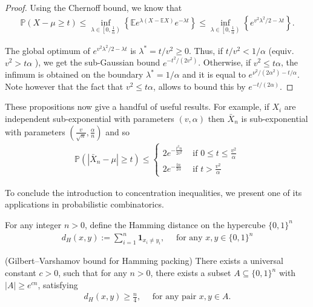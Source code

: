 \begin{proof}
    Using the Chernoff bound, we know that
\begin{align*}
\mathbb{P}(X-\mu \geq t) \leq \inf _{\lambda \in\left[0, \frac{1}{\alpha}\right)}\left\{\mathbb{E} e^{\lambda(X-\mathbb{E} X)} e^{-\lambda t}\right\} \leq \inf _{\lambda \in\left[0, \frac{1}{\alpha}\right)}\left\{e^{v^2 \lambda^2 / 2-\lambda t}\right\} .
\end{align*}


The global optimum of $e^{v^2 \lambda^2 / 2-\lambda t}$ is $\lambda^*=t / v^2 \geq 0$. Thus, if $t / v^2< 1 / \alpha$ (equiv. $v^2>t \alpha$ ), we get the sub-Gaussian bound $e^{-t^2 /\left(2 v^2\right)}$.
Otherwise, if $v^2 \leq t \alpha$, the infimum is obtained on the boundary $\lambda^*=1 / \alpha$ and it is equal to $e^{\nu^2 /\left(2 \alpha^2\right)-t / \alpha}$. Note however that the fact that $v^2 \leq t \alpha$, allows to bound this by $e^{-t /(2 \alpha)}$.
\end{proof}

 
\begin{remark}
    These propositions now give a handful of useful results. For example, if $X_i$ are independent sub-exponential with parameters $(v, \alpha)$ then $\bar{X}_n$ is sub-exponential with parameters $\left(\frac{v}{\sqrt{n}}, \frac{\alpha}{n}\right)$ and so
\begin{align*}
\mathbb{P}\left(\left|\bar{X}_n-\mu\right| \geq t\right) \leq \begin{cases}2 e^{-\frac{t^2 n}{2 v^2}} & \text { if } 0 \leq t \leq \frac{v^2}{\alpha} \\ 2 e^{-\frac{t n}{2 \alpha}} & \text { if } t>\frac{v^2}{\alpha}\end{cases}
\end{align*}
\end{remark}



To conclude the introduction to concentration inequalities, we present one of its applications in probabilistic combinatorics.

\begin{de}
    For any integer $n>0$, define the Hamming distance on the hypercube $\{0,1\}^n$
\begin{align*}
d_H(x, y):=\sum_{i=1}^n \mathbf{1}_{x_i \neq y_i}, \quad \text { for any } x, y \in\{0,1\}^n
\end{align*}
\end{de}

\begin{thm} (Gilbert–Varshamov bound for Hamming packing) There exists a universal constant $c>0$, such that for any $n>0$, there exists a subset $A \subseteq\{0,1\}^n$ with $|A| \geq e^{c n}$, satisfying
\begin{align*}
d_H(x, y) \geq \frac{n}{4}, \quad \text { for any pair } x, y \in A .
\end{align*}
\end{thm}

